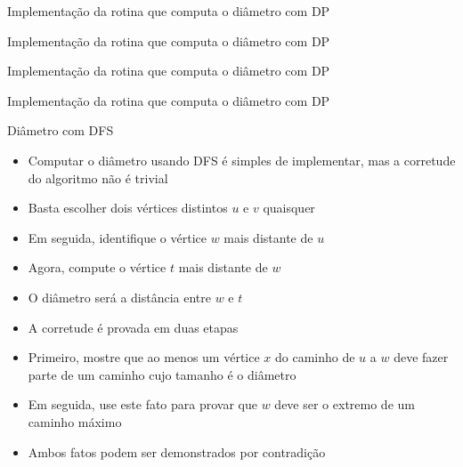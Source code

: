 \begin{frame}[fragile]{Implementação da rotina que computa o diâmetro com DP}
\end{frame}

\begin{frame}[fragile]{Implementação da rotina que computa o diâmetro com DP}
\end{frame}

\begin{frame}[fragile]{Implementação da rotina que computa o diâmetro com DP}
\end{frame}

\begin{frame}[fragile]{Implementação da rotina que computa o diâmetro com DP}
\end{frame}

\begin{frame}[fragile]{Diâmetro com DFS}

    \begin{itemize}
        \item Computar o diâmetro usando DFS é simples de implementar, mas a corretude do
            algoritmo não é trivial

        \item Basta escolher dois vértices distintos $u$ e $v$ quaisquer

        \item Em seguida, identifique o vértice $w$ mais distante de $u$

        \item Agora, compute o vértice $t$ mais distante de $w$

        \item O diâmetro será a distância entre $w$ e $t$

        \item A corretude é provada em duas etapas

        \item Primeiro, mostre que ao menos um vértice $x$ do caminho de $u$ a $w$ deve
            fazer parte de um caminho cujo tamanho é o diâmetro

        \item Em seguida, use este fato para provar que $w$ deve ser o extremo de um caminho 
            máximo

        \item Ambos fatos podem ser demonstrados por contradição
    \end{itemize}

\end{frame}

